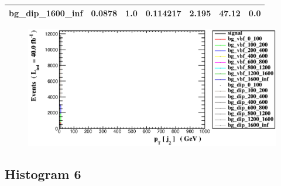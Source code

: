 \documentclass[a4paper, 10pt]{article}
\begin{document}
\begin{table}[H]
\begin{center}
\begin{tabular}{|m{23.0mm}|m{23.0mm}|m{18.0mm}|m{19.0mm}|m{19.0mm}|m{19.0mm}|m{19.0mm}|}
      \hline
      {\cellcolor{white}         bg\_dip\_1600\_inf}& {\cellcolor{white}         0.0878}& {\cellcolor{white}         1.0}& {\cellcolor{white}         0.114217}& {\cellcolor{white}         2.195}& {\cellcolor{red}         47.12}& {\cellcolor{red}         0.0}\\
\hline
    \end{tabular}
  \end{center}
\end{table}

\begin{figure}[H]
  \begin{center}
    \includegraphics[scale=0.45]{selection_4.eps}\\
\caption{   }
  \end{center}
\end{figure}
      \newpage
\subsection{ Histogram 6}
\end{document}
